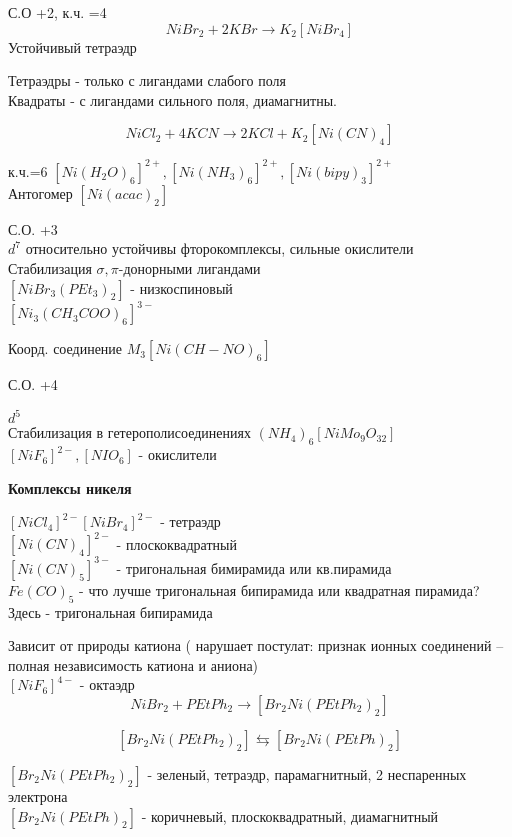 С.О +2, к.ч. =4\\
$$NiBr_2 + 2KBr \rightarrow K_2[NiBr_4]$$
Устойчивый тетраэдр

Тетраэдры - только с лигандами слабого поля\\
Квадраты - с лигандами сильного поля, диамагнитны.

$$NiCl_2 + 4KCN \rightarrow 2KCl + K_2[Ni(CN)_4]$$

к.ч.=6 $[Ni(H_2O)_6]^{2+}, [Ni(NH_3)_6]^{2+}, [Ni(bipy)_3]^{2+}$\\
Антогомер $[Ni(acac)_2]$

С.О. +3\\
$d^7$ относительно устойчивы фторокомплексы, сильные окислители\\
Стабилизация $\sigma,\pi$-донорными лигандами\\
$[NiBr_3(PEt_3)_2]$ - низкоспиновый\\
$[Ni_3(CH_3COO)_6]^{3-}$

Коорд. соединение $M_3[Ni(CH-NO)_6]$

С.О.  +4

$d^5$\\
Стабилизация в гетерополисоединениях $(NH_4)_6[NiMo_9O_{32}]$\\
$[NiF_6]^{2-},  [NIO_6]$ - окислители

\textbf{Комплексы никеля}

$[NiCl_4]^{2-} [NiBr_4]^{2-}$  - тетраэдр\\
$[Ni(CN)_4]^{2-}$ - плоскоквадратный\\
$[Ni(CN)_5]^{3-}$ - тригональная бимирамида или кв.пирамида\\
$Fe(CO)_5$ - что лучше тригональная бипирамида или квадратная пирамида? Здесь - тригональная бипирамида

Зависит от природы катиона ( нарушает постулат:  признак ионных соединений -- полная независимость катиона и аниона)\\

$[NiF_6]^{4-}$ - октаэдр\\

$$NiBr_2 + PEtPh_2 \rightarrow [Br_2Ni(PEtPh_2)_2]$$

$$[Br_2Ni(PEtPh_2)_2] \leftrightarrows [Br_2Ni(PEtPh)_2]$$

$[Br_2Ni(PEtPh_2)_2]$ - зеленый, тетраэдр, парамагнитный, 2 неспаренных электрона\\

$[Br_2Ni(PEtPh)_2]$ - коричневый, плоскоквадратный, диамагнитный\\

